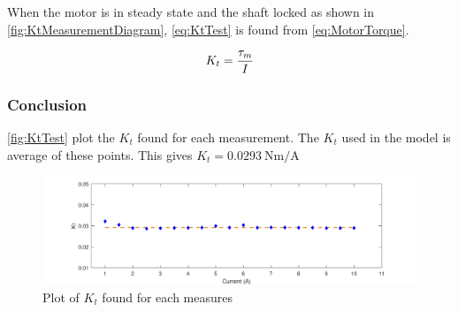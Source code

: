 When the motor is in steady state and the shaft locked as shown in \autoref{fig:KtMeasurementDiagram}, \autoref{eq:KtTest} is found from \autoref{eq:MotorTorque}.

\begin{equation}\label{eq:KtTest}
K_t=\frac{\tau_m}{I} \addunit{\newton\meter\per\ampere}
\end{equation}
\startexplain
{}
\stopexplain

\subsubsection*{Conclusion}

\autoref{fig:KtTest} plot the $K_t$ found for each measurement. The $K_t$ used in the model is average of these points. This gives $K_t=\SI{0.0293}{\newton\meter\per\ampere}$

\begin{figure}[htbp]
	\centering
	\includegraphics[width=\textwidth]{figures/appendix/Motor&GearTests/PlotKt}
	\caption{Plot of $K_t$ found for each measures}\label{fig:KtTest}
\end{figure}
